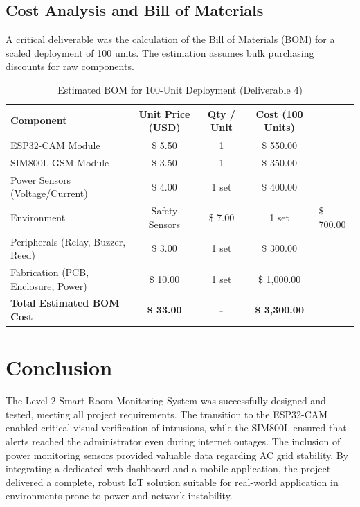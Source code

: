 \documentclass[12pt,a4paper]{article}
\begin{document}
\subsection{Cost Analysis and Bill of Materials}
A critical deliverable was the calculation of the Bill of Materials (BOM) for a scaled deployment of 100 units. The estimation assumes bulk purchasing discounts for raw components. 

\begin{table}[H]
\centering
\begin{tabular}{|l|c|c|c|}
\hline
\textbf{Component} & \textbf{Unit Price (USD)} & \textbf{Qty / Unit} & \textbf{Cost (100 Units)} \\ \hline
ESP32-CAM Module & \$ 5.50 & 1 & \$ 550.00 \\ \hline
SIM800L GSM Module & \$ 3.50 & 1 & \$ 350.00 \\ \hline
Power Sensors (Voltage/Current) & \$ 4.00 & 1 set & \$ 400.00 \\ \hline
Environment & Safety Sensors & \$ 7.00 & 1 set & \$ 700.00 \\ \hline
Peripherals (Relay, Buzzer, Reed) & \$ 3.00 & 1 set & \$ 300.00 \\ \hline
Fabrication (PCB, Enclosure, Power) & \$ 10.00 & 1 set & \$ 1,000.00 \\ \hline
\textbf{Total Estimated BOM Cost} & \textbf{\$ 33.00} & \textbf{-} & \textbf{\$ 3,300.00} \\ \hline
\end{tabular}
\caption{Estimated BOM for 100-Unit Deployment (Deliverable 4)}
\end{table}

\section{Conclusion}
The Level 2 Smart Room Monitoring System was successfully designed and tested, meeting all project requirements. The transition to the ESP32-CAM enabled critical visual verification of intrusions, while the SIM800L ensured that alerts reached the administrator even during internet outages. The inclusion of power monitoring sensors provided valuable data regarding AC grid stability. By integrating a dedicated web dashboard and a mobile application, the project delivered a complete, robust IoT solution suitable for real-world application in environments prone to power and network instability.
\end{document}
